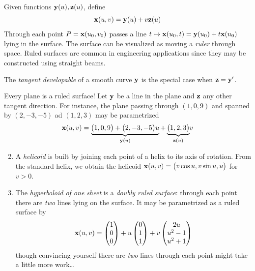 \goodbreak

 Given functions ${\mathbf{y}}(u),{\mathbf{z}}(u)$, define
	\[{\mathbf{x}}(u,v)={\mathbf{y}}(u)+v{\mathbf{z}}(u)\]
	Through each point $P={\mathbf{x}}(u_0,v_0)$ passes a line $t\mapsto {\mathbf{x}}(u_0,t)={\mathbf{y}}(u_0)+t{\mathbf{x}}(u_0)$ lying in the surface. The surface can be visualized as moving a \emph{ruler} through space. Ruled surfaces are common in engineering applications since they may be constructed using straight beams.
	
\begin{defn}{}{}
The \emph{tangent developable} of a smooth curve ${\mathbf{y}}$ is the special case when ${\mathbf{z}}={\mathbf{y}}'$.
\end{defn}

\begin{examples}{}{}
\exstart Every plane is a ruled surface! Let ${\mathbf{y}}$ be a line in the plane and ${\mathbf{z}}$ any other tangent direction. For instance, the plane passing through $(1,0,9)$ and spanned by $(2,-3,-5)$ ad $(1,2,3)$ may be parametrized
\[\vx(u,v)%
=\underbrace{\bigl(1,0,9\bigr)+\bigl(2,-3,-5\bigr)u}_{\vy(u)}+\underbrace{\bigl(1,2,3\bigr)}_{\vz(u)}\!v\]
\begin{enumerate}\setcounter{enumi}{1}
	\item A \emph{helicoid} is built by joining each point of a helix to its axis of rotation. From the standard helix, we obtain the helicoid ${\mathbf{x}}(u,v)=\bigl(v\cos u,v\sin u,u\bigr)$ for $v>0$.
  \item\label{page:hyperrule} The \emph{hyperboloid of one sheet} is a \emph{doubly ruled surface}: through each point there are \emph{two} lines lying on the surface. It may be parametrized as a ruled surface by
\[{\mathbf{x}}(u,v)=\begin{pmatrix}1\\0\\0\end{pmatrix}+u\begin{pmatrix}0\\1\\1\end{pmatrix}+v\begin{pmatrix}2u\\u^2-1\\u^2+1\end{pmatrix}\]
though convincing yourself there are \emph{two} lines through each point might take a little more work\ldots


\end{enumerate}
\end{examples}

